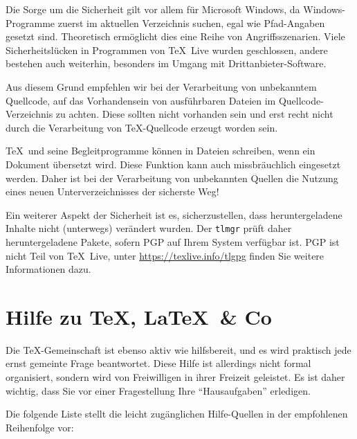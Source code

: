 \documentclass[12pt,ngerman,a4paper,fullparskip]{scrreprt}
\newcommand{\TL}{\TeX\ Live\xspace}
\newcommand{\prog}[1]{\texttt{#1}}
\begin{document}
Die Sorge um die Sicherheit gilt vor allem für Microsoft Windows, da Windows-Programme zuerst im aktuellen Verzeichnis suchen, egal wie Pfad-Angaben gesetzt sind. Theoretisch ermöglicht dies eine Reihe von Angriffsszenarien. Viele Sicherheitslücken in Programmen von \TL wurden geschlossen, andere bestehen auch weiterhin, besonders im Umgang mit Drittanbieter-Software. 

Aus diesem Grund empfehlen wir bei der Verarbeitung von unbekanntem Quellcode, auf das Vorhandensein von ausführbaren Dateien im Quellcode-Verzeichnis zu achten. Diese sollten nicht vorhanden sein und erst recht nicht durch die Verarbeitung von \TeX-Quellcode erzeugt worden sein. 

\TeX\ und seine Begleitprogramme können in Dateien schreiben, wenn ein Dokument übersetzt wird. Diese Funktion kann auch missbräuchlich eingesetzt werden. Daher ist bei der Verarbeitung von unbekannten Quellen die Nutzung eines neuen Unterverzeichnisses der sicherste Weg!

Ein weiterer Aspekt der Sicherheit ist es, sicherzustellen, dass heruntergeladene Inhalte nicht (unterwegs) verändert wurden. Der \prog{tlmgr} prüft daher heruntergeladene Pakete, sofern PGP auf Ihrem System verfügbar ist. PGP ist nicht Teil von \TL,  unter \url{https://texlive.info/tlgpg} finden Sie weitere Informationen dazu.

\section{Hilfe zu \TeX, \LaTeX\ \& Co}\label{sec:help}

Die \TeX-Gemeinschaft ist ebenso aktiv wie hilfsbereit, und es wird
praktisch jede ernst gemeinte Frage beantwortet. Diese Hilfe ist allerdings
nicht formal organisiert, sondern wird von Freiwilligen in ihrer
Freizeit geleistet. Es ist daher wichtig, dass Sie vor einer
Fragestellung Ihre \enquote{Hausaufgaben}  erledigen. 


Die folgende Liste stellt die leicht zugänglichen Hilfe-Quellen in der
empfohlenen Reihenfolge vor:
\end{document}
